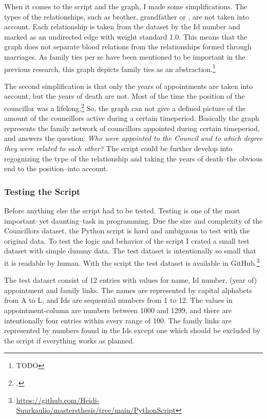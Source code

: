 When it comes to the script and the graph, I made some simplifications. The types of the relationships, such as brother, grandfather or , are not taken into account. Each relationship is taken from the dataset by the Id number and marked as an undirected edge with weight standard 1.0. This means that the graph does not separate blood relations from the relationships formed through marriages. As family ties per se have been mentioned to be important in the previous research, this graph depicts family ties as an abstraction.\footnote{TODO} 

The second simplification is that only the years of appointments are taken into account, but the years of death are not. Most of the time the position of the councillor was a lifelong.\footcite[TODO]{HakanenAKoskinen2017} So, the graph can not give a defined picture of the amount of the councillors active during a certain timeperiod. Basically the graph represents the family network of councillors appointed during certain timeperiod, and answers the question: \textit{Who were appointed to the Council and to which degree they were related to each other?} The script could be further develop into regognizing the type of the relationship and taking the years of death–the obvious end to the position–into account.

\subsubsection{Testing the Script}
Before anything else the script had to be tested. Testing is one of the most important–yet daunting–task in programming. Due the size and complexity of the Councillors dataset, the Python script is hard and ambiguous to test with the original data. To test the logic and behavior of the script I crated a small test dataset with simple dummy data. The test dataset is intentionally so small that it is readable by human. With the script the test dataset is available in GitHub.\footnote{\url{https://github.com/Heidi-Suurkaulio/mastersthesis/tree/main/PythonScript}} 

The test dataset consist of 12 entries with values for name, Id number, (year of) appointment and family links. The names are represented by capital alphabets from A to L, and Ids are sequential numbers from 1 to 12. The values in appointment-column are numbers between 1000 and 1299, and there are intentionally four entries within every range of 100. The family links are represented by numbers found in the Ids except one which should be excluded by the script if everything works as planned. 

